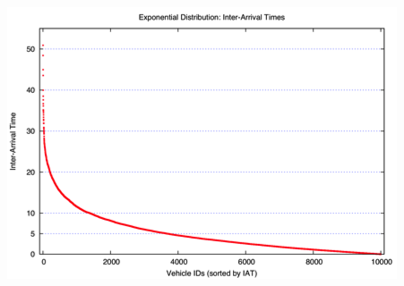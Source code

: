 \documentclass[landscape,a0paper,fontscale=0.285]{baposter}
\begin{document}
\begin{poster}
{\begin{multicols}{2}
\begin{center}
\includegraphics[width=.35\linewidth]{rv}
\end{center}
\end{multicols}



}


\end{poster}
\end{document}
